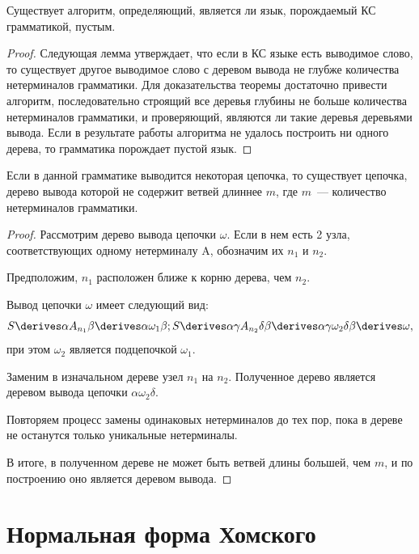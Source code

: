 \begin{theorem}
    Существует алгоритм, определяющий, является ли язык, порождаемый КС грамматикой, пустым.
\end{theorem}

\begin{proof}
    Следующая лемма утверждает, что если в КС языке есть выводимое слово, то существует другое выводимое слово с деревом вывода не глубже количества нетерминалов грамматики.
    Для доказательства теоремы достаточно привести алгоритм, последовательно строящий все деревья глубины не больше количества нетерминалов грамматики, и проверяющий, являются ли такие деревья деревьями вывода.
    Если в результате работы алгоритма не удалось построить ни одного дерева, то грамматика порождает пустой язык.
\end{proof}

\begin{lemma}
    Если в данной грамматике выводится некоторая цепочка, то существует цепочка, дерево вывода которой не содержит ветвей длиннее $m$, где $m$~--- количество нетерминалов грамматики.
\end{lemma}

\begin{proof}
    Рассмотрим дерево вывода цепочки $\omega$. Если в нем есть 2 узла, соответствующих одному нетерминалу A, обозначим их $n_1$ и $n_2$.

    Предположим, $n_1$ расположен ближе к корню дерева, чем $n_2$.

    Вывод цепочки $\omega$ имеет следующий вид:
    \[S \derives \alpha A_{n_1} \beta \derives \alpha \omega_1 \beta; S \derives \alpha \gamma A_{n_2} \delta \beta \derives \alpha \gamma \omega_2 \delta \beta \derives \omega,\]
    при этом $\omega_2$ является подцепочкой $\omega_1$.

    Заменим в изначальном дереве узел $n_1$ на $n_2$. Полученное дерево является деревом вывода цепочки $\alpha \omega_2 \delta$.

    Повторяем процесс замены одинаковых нетерминалов до тех пор, пока в дереве не останутся только уникальные нетерминалы.

    В итоге, в полученном дереве не может быть ветвей длины большей, чем $m$, и по построению оно является деревом вывода.
\end{proof}


\section{Нормальная форма Хомского}
\label{section:CNF}

